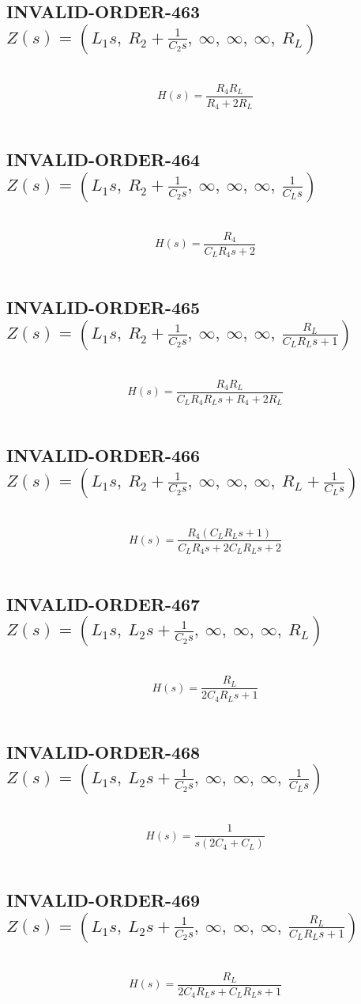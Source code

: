 \documentclass{article}
\begin{document}
\subsection{INVALID-ORDER-463 $Z(s) = \left( L_{1} s, \  R_{2} + \frac{1}{C_{2} s}, \  \infty, \  \infty, \  \infty, \  R_{L}\right)$ } \ 
\textbf{\[H(s) = \frac{R_{4} R_{L}}{R_{4} + 2 R_{L}}\] } \ 
\subsection{INVALID-ORDER-464 $Z(s) = \left( L_{1} s, \  R_{2} + \frac{1}{C_{2} s}, \  \infty, \  \infty, \  \infty, \  \frac{1}{C_{L} s}\right)$ } \ 
\textbf{\[H(s) = \frac{R_{4}}{C_{L} R_{4} s + 2}\] } \ 
\subsection{INVALID-ORDER-465 $Z(s) = \left( L_{1} s, \  R_{2} + \frac{1}{C_{2} s}, \  \infty, \  \infty, \  \infty, \  \frac{R_{L}}{C_{L} R_{L} s + 1}\right)$ } \ 
\textbf{\[H(s) = \frac{R_{4} R_{L}}{C_{L} R_{4} R_{L} s + R_{4} + 2 R_{L}}\] } \ 
\subsection{INVALID-ORDER-466 $Z(s) = \left( L_{1} s, \  R_{2} + \frac{1}{C_{2} s}, \  \infty, \  \infty, \  \infty, \  R_{L} + \frac{1}{C_{L} s}\right)$ } \ 
\textbf{\[H(s) = \frac{R_{4} \left(C_{L} R_{L} s + 1\right)}{C_{L} R_{4} s + 2 C_{L} R_{L} s + 2}\] } \ 
\subsection{INVALID-ORDER-467 $Z(s) = \left( L_{1} s, \  L_{2} s + \frac{1}{C_{2} s}, \  \infty, \  \infty, \  \infty, \  R_{L}\right)$ } \ 
\textbf{\[H(s) = \frac{R_{L}}{2 C_{4} R_{L} s + 1}\] } \ 
\subsection{INVALID-ORDER-468 $Z(s) = \left( L_{1} s, \  L_{2} s + \frac{1}{C_{2} s}, \  \infty, \  \infty, \  \infty, \  \frac{1}{C_{L} s}\right)$ } \ 
\textbf{\[H(s) = \frac{1}{s \left(2 C_{4} + C_{L}\right)}\] } \ 
\subsection{INVALID-ORDER-469 $Z(s) = \left( L_{1} s, \  L_{2} s + \frac{1}{C_{2} s}, \  \infty, \  \infty, \  \infty, \  \frac{R_{L}}{C_{L} R_{L} s + 1}\right)$ } \ 
\textbf{\[H(s) = \frac{R_{L}}{2 C_{4} R_{L} s + C_{L} R_{L} s + 1}\] } \ 
\end{document}
